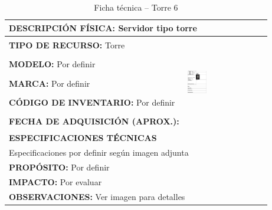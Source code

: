 \begin{table}[H]
\centering
\caption{Ficha técnica -- Torre 6}
\label{tab:torre-6}
\begin{tabular}{|p{}|p{}|}
\hline
\multicolumn{2}{|l|}{\textbf{DESCRIPCIÓN FÍSICA:} Servidor tipo torre} \\ \hline
\textbf{TIPO DE RECURSO:} Torre & 
\multirow{5}{*}{\includegraphics[width=0.25\textwidth,height=4cm,keepaspectratio]{tablas-images/cp1/torres/torre-6.png}} \\ \cline{1-1}
\textbf{MODELO:} Por definir & \\ \cline{1-1}
\textbf{MARCA:} Por definir & \\ \cline{1-1}
\textbf{CÓDIGO DE INVENTARIO:} Por definir & \\ \cline{1-1}
\textbf{FECHA DE ADQUISICIÓN (APROX.):} & \\ \hline
\multicolumn{2}{|l|}{\textbf{ESPECIFICACIONES TÉCNICAS}} \\ \hline
\multicolumn{2}{|p{0.95\textwidth}|}{
\footnotesize
Especificaciones por definir según imagen adjunta
} \\ \hline
\multicolumn{2}{|l|}{\textbf{PROPÓSITO:} Por definir} \\ \hline
\multicolumn{2}{|l|}{\textbf{IMPACTO:} Por evaluar} \\ \hline
\multicolumn{2}{|l|}{\textbf{OBSERVACIONES:} Ver imagen para detalles} \\ \hline
\end{tabular}
\end{table}


